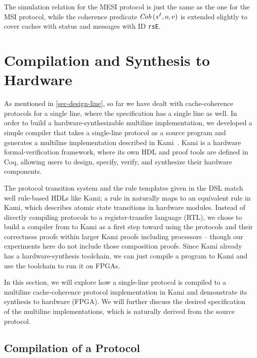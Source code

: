 \documentclass[sigplan,10pt,review,anonymous,screen]{acmart}\settopmatter{printfolios=true,printccs=false,printacmref=false}
\def\slstinline{\lstinline[basicstyle=\ttfamily\small]}
\begin{document}
The simulation relation for the MESI protocol is just the same as the one for the MSI protocol, while the coherence predicate $\textit{Coh}\,(s^I, o, v)$ is extended slightly to cover caches with \stE{} status and messages with ID \slstinline{rsE}.

\section{Compilation and Synthesis to Hardware}
\label{sec-synthesis}

As mentioned in \autoref{sec-design-line}, so far we have dealt with cache-coherence protocols for a single line, where the specification has a single line as well.
In order to build a hardware-synthesizable multiline implementation, we developed a simple compiler that takes a single-line \hemiola{} protocol as a source program and generates a multiline implementation described in Kami~\cite{kami}.
Kami is a hardware formal-verification framework, where its own HDL and proof tools are defined in Coq, allowing users to design, specify, verify, and synthesize their hardware components.

The protocol transition system and the rule templates given in the \hemiola{} DSL match well rule-based HDLs like Kami; a rule in \hemiola{} naturally maps to an equivalent rule in Kami, which describes atomic state transitions in hardware modules.
Instead of directly compiling \hemiola{} protocols to a register-transfer language (RTL), we chose to build a compiler from \hemiola{} to Kami as a first step toward using the protocols and their correctness proofs within larger Kami proofs including processors -- though our experiments here do not include those composition proofs.
Since Kami already has a hardware-synthesis toolchain, we can just compile a \hemiola{} program to Kami and use the toolchain to run it on FPGAs.

In this section, we will explore how a single-line \hemiola{} protocol is compiled to a multiline cache-coherence protocol implementation in Kami and demonstrate its synthesis to hardware (FPGA).
We will further discuss the desired specification of the multiline implementations, which is naturally derived from the source \hemiola{} protocol.

\subsection{Compilation of a \hemiola{} Protocol}
\label{sec-compiler}
\end{document}
